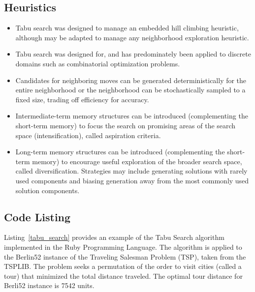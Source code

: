 \subsection{Heuristics}
\begin{itemize}
	\item Tabu search was designed to manage an embedded hill climbing heuristic, although may be adapted to manage any neighborhood exploration heuristic.
	\item Tabu search was designed for, and has predominately been applied to discrete domains such as combinatorial optimization problems.
	\item Candidates for neighboring moves can be generated deterministically for the entire neighborhood or the neighborhood can be stochastically sampled to a fixed size, trading off efficiency for accuracy. 
	\item Intermediate-term memory structures can be introduced (complementing the short-term memory) to focus the search on promising areas of the search space (intensification), called aspiration criteria.
	\item Long-term memory structures can be introduced (complementing the short-term memory) to encourage useful exploration of the broader search space, called diversification. Strategies may include generating solutions with rarely used components and biasing generation away from the most commonly used solution components.
\end{itemize}

\subsection{Code Listing}
Listing~\ref{tabu_search} provides an example of the Tabu Search algorithm implemented in the Ruby Programming Language. 
The algorithm is applied to the Berlin52 instance of the Traveling Salesman Problem (TSP), taken from the TSPLIB. The problem seeks a permutation of the order to visit cities (called a tour) that minimized the total distance traveled. The optimal tour distance for Berli52 instance is 7542 units.

